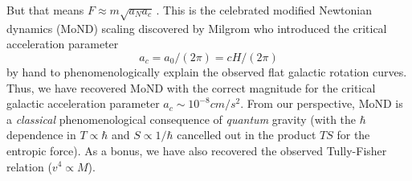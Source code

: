 \documentclass[a4paper]{jpconf}
\begin{document}
But that means $F \approx m \sqrt{a_N a_c}\,$.
This is the celebrated modified Newtonian dynamics (MoND)
scaling \cite{mond,FandM,interpol} discovered by Milgrom who introduced the 
critical acceleration parameter 
\begin{equation}
a_c = a_0/ (2 \pi) = c H / (2 \pi) 
\end{equation}
by hand to phenomenologically explain the 
observed flat galactic rotation curves.  
Thus, we have recovered MoND with the correct
magnitude for the critical galactic acceleration parameter $a_c \sim 
10^{-8} cm/s^2$.
From our perspective, MoND is a {\it classical} phenomenological
consequence of {\it quantum} gravity (with the $\hbar$ dependence
in $T \propto \hbar$ and $S \propto 1/\hbar$ cancelled out in the 
product $TS$ for the entropic force). \cite{HMN}  As a 
bonus, we have also recovered the observed Tully-Fisher relation ($v^4 \propto 
M$).\\
\end{document}
